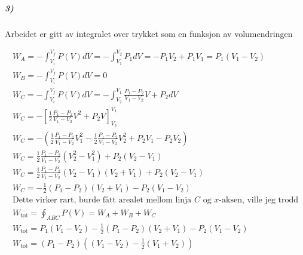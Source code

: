 \documentclass[11pt, A4paper,norsk]{article}
\begin{document}
			\subparagraph{3)}
				\begin{flushleft}
Arbeidet er gitt av integralet over trykket som en funksjon av volumendringen
				\end{flushleft}
				\begin{gather*}
W_A = - \int_{V_i}^{V_f} P(V) dV = - \int_{V_1}^{V_2} P_1 dV = - P_1 V_2 + P_1 V_1 = P_1 (V_1 - V_2) \\
W_B = - \int_{V_i}^{V_f} P(V) dV = 0 \\
W_C = - \int_{V_i}^{V_f} P(V) dV = - \int_{V_2}^{V_1} \frac{P_1 - P_2}{V_1 - V_2} V + P_2 dV \\
W_C = - \left[ \frac{1}{2} \frac{P_1 - P_2}{V_1 - V_2} V^2 + P_2 V \right]_{V_2}^{V_1} \\
W_C = - \left( \frac{1}{2} \frac{P_1 - P_2}{V_1 - V_2} V_1^2 - \frac{1}{2} \frac{P_1 - P_2}{V_1 - V_2} V_2^2 + P_2 V_1 - P_2 V_2 \right) \\
W_C = \frac{1}{2} \frac{P_1 - P_2}{V_1 - V_2} (V_2^2 - V_1^2) + P_2 (V_2 - V_1)  \\
W_C = \frac{1}{2} \frac{P_1 - P_2}{V_1 - V_2} (V_2 - V_1)(V_2 + V_1) + P_2 (V_2 - V_1)  \\
W_C = - \frac{1}{2} (P_1 - P_2)(V_2 + V_1) - P_2 (V_1 - V_2)  \\
\text{Dette virker rart, burde fått arealet mellom linja $C$ og $x$-aksen, ville jeg trodd} \\
W_{\text{tot}} = \oint_{ABC} P(V) = W_A + W_B + W_C \\
W_{\text{tot}} = P_1 (V_1 - V_2) - \frac{1}{2} (P_1 - P_2)(V_2 + V_1) - P_2 (V_1 - V_2) \\
W_{\text{tot}} = (P_1 - P_2) \left( (V_1 - V_2) - \frac{1}{2} (V_1 + V_2) \right)
				\end{gather*}
			
\end{document}

